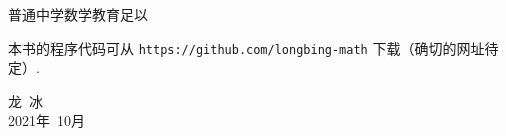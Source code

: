 普通中学数学教育足以


本书的程序代码可从 \verb|https://github.com/longbing-math| 下载（确切的网址待定）.


{\kaishu
	\begin{center}
		\hspace*{88mm}龙\,   冰\\
		\hspace*{88mm}2021年~10月
	\end{center}
}

%

